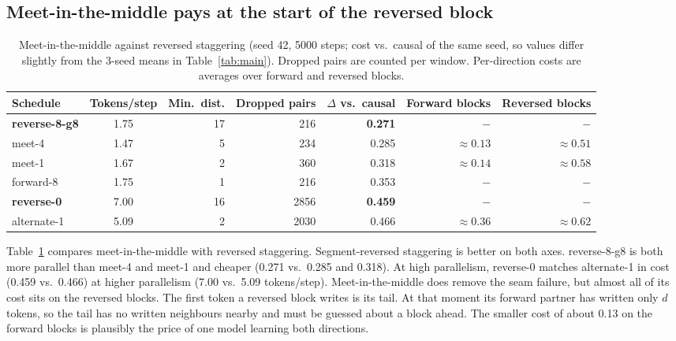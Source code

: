 \documentclass[11pt]{article}
\theoremstyle{definition}
\theoremstyle{remark}
\newcommand{\sch}[1]{\textsf{#1}}
\begin{document}
\subsection{Meet-in-the-middle pays at the start of the reversed block}

\begin{table}[t]
  \centering
  \caption{Meet-in-the-middle against reversed staggering (seed 42, 5000 steps; cost vs.\ causal of the same seed, so values differ slightly from the 3-seed means in Table~\ref{tab:main}). Dropped pairs are counted per window. Per-direction costs are averages over forward and reversed blocks.}
  \label{tab:meet}
  \small
  \begin{tabular}{lcrrrrr}
    \toprule
    Schedule & Tokens/step & Min.\ dist. & Dropped pairs & $\Delta$ vs.\ causal & Forward blocks & Reversed blocks \\
    \midrule
    \textbf{\sch{reverse-8-g8}} & 1.75 & 17 & 216  & \textbf{0.271} & $-$ & $-$ \\
    \sch{meet-4}                & 1.47 & 5  & 234  & 0.285 & $\approx0.13$ & $\approx0.51$ \\
    \sch{meet-1}                & 1.67 & 2  & 360  & 0.318 & $\approx0.14$ & $\approx0.58$ \\
    \sch{forward-8}             & 1.75 & 1  & 216  & 0.353 & $-$ & $-$ \\
    \midrule
    \textbf{\sch{reverse-0}}    & 7.00 & 16 & 2856 & \textbf{0.459} & $-$ & $-$ \\
    \sch{alternate-1}           & 5.09 & 2  & 2030 & 0.466 & $\approx0.36$ & $\approx0.62$ \\
    \bottomrule
  \end{tabular}
\end{table}

Table~\ref{tab:meet} compares meet-in-the-middle with reversed staggering.
Segment-reversed staggering is better on both axes.
\sch{reverse-8-g8} is both more parallel than \sch{meet-4} and \sch{meet-1} and cheaper (0.271 vs.\ 0.285 and 0.318).
At high parallelism, \sch{reverse-0} matches \sch{alternate-1} in cost (0.459 vs.\ 0.466) at higher parallelism (7.00 vs.\ 5.09 tokens/step).
Meet-in-the-middle does remove the seam failure, but almost all of its cost sits on the reversed blocks.
The first token a reversed block writes is its tail.
At that moment its forward partner has written only $d$ tokens, so the tail has no written neighbours nearby and must be guessed about a block ahead.
The smaller cost of about 0.13 on the forward blocks is plausibly the price of one model learning both directions.
\end{document}
